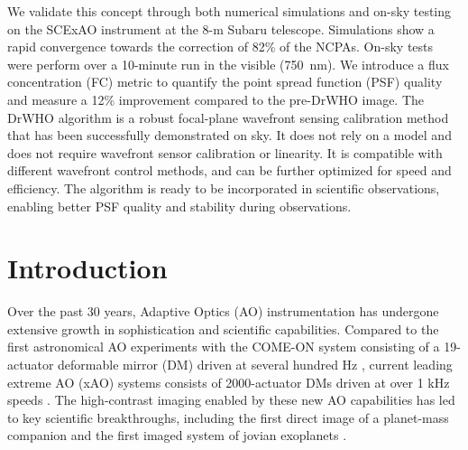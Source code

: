\documentclass[twocolumn]{aa}
\newcommand{\anthony}[1]{\textcolor{magenta}{#1}}
\begin{document}
   {We validate this concept through both numerical simulations and on-sky %
   testing on the SCExAO instrument at the 8-m Subaru telescope. Simulations show a rapid convergence towards the correction of 82\% of the NCPAs. On-sky tests were perform over a 10-minute run in the visible (750~nm). We introduce a flux concentration (FC) metric to quantify the point spread function (PSF) quality and measure a  12\% improvement compared to the pre-DrWHO image.}
   {The DrWHO algorithm is a robust focal-plane wavefront sensing calibration method that has been successfully demonstrated on sky. It does not rely on a model and does not require wavefront sensor calibration or linearity. It is compatible with different 
   wavefront control methods, and can be further optimized for speed and efficiency. 
   The algorithm is ready to be incorporated in scientific observations, enabling better PSF quality and stability during observations.}


   \maketitle



\section{Introduction} \label{sec:intro}
Over the past 30 years, Adaptive Optics (AO) instrumentation has undergone extensive growth in sophistication and scientific capabilities. Compared to the first astronomical AO experiments with the COME-ON system consisting of a 19-actuator deformable mirror (DM) driven at several hundred Hz \citep{Kern1989,Rousset1990}, current leading extreme AO (xAO) systems consists of 2000-actuator DMs driven at over 1 kHz speeds \citep[e.g.][]{GPIMacintosh2014,Beuzit2019}. The high-contrast imaging enabled by these new AO capabilities has led to key scientific breakthroughs, including the first direct image of a planet-mass companion \citep{chauvin2004} and the first imaged system of jovian exoplanets \citep{Marois2008}.  
\end{document}
